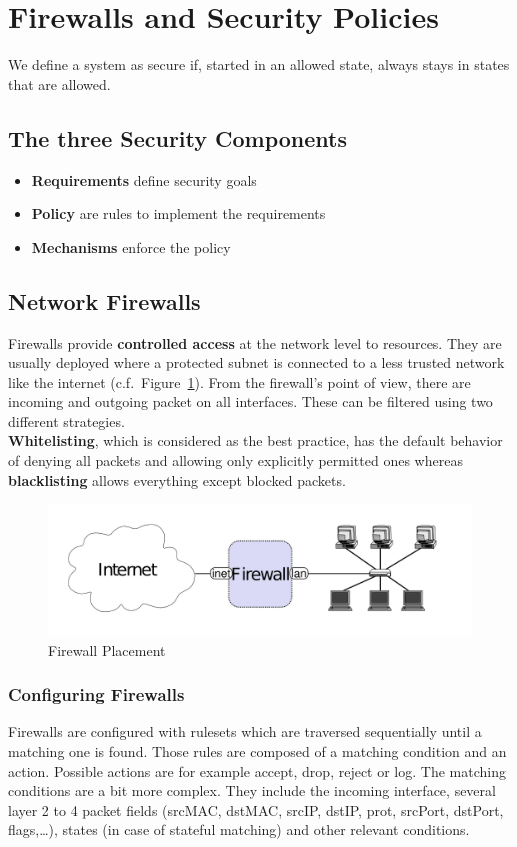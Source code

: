 
\section{Firewalls and Security Policies}
We define a system as secure if, started in an allowed state, always stays in states that are allowed.

\subsection{The three Security Components}
\begin{itemize}
  \item \textbf{Requirements} define security goals
  \item \textbf{Policy} are rules to implement the requirements
  \item \textbf{Mechanisms} enforce the policy
\end{itemize}

\subsection{Network Firewalls}
Firewalls provide \textbf{controlled access} at the network level to resources.
They are usually deployed where a protected subnet is connected to a less trusted network like the internet (c.f.\ Figure~\ref{fig:firewall_placement}).
From the firewall's point of view, there are incoming and outgoing packet on all interfaces.
These can be filtered using two different strategies.\\
\textbf{Whitelisting}, which is considered as the best practice, has the default behavior of denying all packets and allowing only explicitly permitted ones whereas \textbf{blacklisting} allows everything except blocked packets.


\begin{figure}[h]
  \centering
  \includegraphics[width=.8\textwidth]{figures/firewall_placement.png}
  \caption{Firewall Placement}\label{fig:firewall_placement}
\end{figure}

\subsubsection*{Configuring Firewalls}
Firewalls are configured with rulesets which are traversed sequentially until a matching one is found.
Those rules are composed of a matching condition and an action.
Possible actions are for example accept, drop, reject or log.
The matching conditions are a bit more complex.
They include the incoming interface, several layer 2 to 4 packet fields (srcMAC, dstMAC, srcIP, dstIP, prot, srcPort, dstPort, flags,\dots), states (in case of stateful matching) and other relevant conditions.

